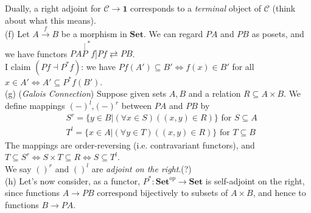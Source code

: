 \documentclass[a4paper]{article}
\begin{document}
\begin{eg}
    Dually, a right adjoint for $\mathcal{C} \to \mathbf{1}$ corresponds to a \emph{terminal} object of $\mathcal{C}$ (think about what this means).\\
    (f) Let $A \xrightarrow{f} B$ be a morphism in $\mathbf{Set}$. We can regard $PA$ and $PB$ as posets, and we have functors $PA \stackrel[P^*f]{Pf}{\rightleftarrows} PB$.\\
    I claim $(Pf \dashv P^*f)$: we have $Pf(A') \subseteq B' \iff f(x) \in B'$ for all $x \in A' \iff A' \subseteq P^* f(B')$.\\
    (g) (\emph{Galois Connection}) Suppose given sets $A,B$ and a relation $R \subseteq A \times B$. We define mappings $(-)^l$,$(-)^r$ between $PA$ and $PB$ by 
    \begin{equation*}
        \begin{aligned}
            &S^r = \{y \in B| (\forall x \in S) ((x,y) \in R) \} \text{ for } S \subseteq A\\
            &T^l = \{x \in A | (\forall y \in T) ((x,y) \in R)\} \text{ for } T \subseteq B
        \end{aligned}
    \end{equation*}
    The mappings are order-reversing (i.e. contravariant functors), and $T \subseteq S^r \iff S \times T \subseteq R \iff S \subseteq T^l$.\\
    We say $()^r$ and $()^l$ are \emph{adjoint on the right}.(?)\\
    (h) Let's now consider, as a functor, $P^* : \mathbf{Set}^{op} \to \mathbf{Set}$ is self-adjoint on the right, since functions $A \to PB$ correspond bijectively to subsets of $A \times B$, and hence to functions $B \to PA$.
\end{eg}
\end{document}
